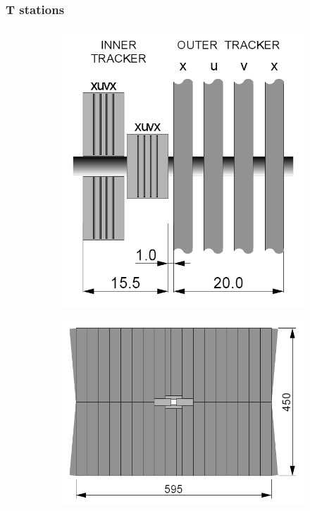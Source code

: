 \subsubsection{T stations}
\begin{figure}[t]
	\centering
	\begin{subfigure}{.45\textwidth}
		\includegraphics[width=\textwidth]{graphics/02-lhcb/t_station_top_view.png}
		\caption{}
		\label{fig:2:t_station_top}
	\end{subfigure}
	\begin{subfigure}{.45\textwidth}
		\includegraphics[width=\textwidth]{graphics/02-lhcb/t_station_front_view.png}

\end{subfigure}
\end{figure}
